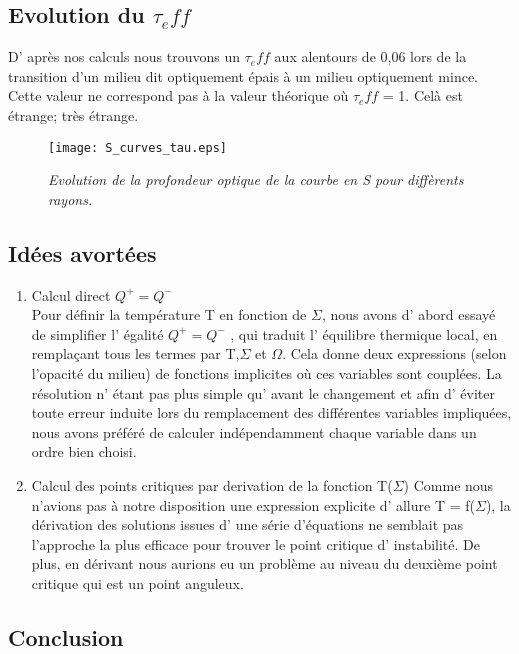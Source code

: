 \subsection{Evolution du $\tau_eff$}

D' après nos calculs nous trouvons un $\tau_eff$ aux alentours de 0,06 lors de la transition d'un milieu dit optiquement épais à un milieu optiquement mince. Cette valeur ne correspond pas à la valeur théorique où $\tau_eff$ = 1. 
Celà est étrange; très étrange.

\begin{figure}[htb!]
	\centering
	\texttt{[image: S\_curves\_tau.eps]}
	\caption{\textit{Evolution de la profondeur optique de la courbe en S pour diffèrents rayons.}  }
	\label{Fig::bench}
\end{figure}

\subsection{Idées avortées}
\begin{enumerate}

\item Calcul direct $Q^+ = Q^-$
\\
Pour définir la température T en fonction de $\Sigma$, nous avons d' abord essayé de simplifier l' égalité $Q^+ = Q^-$ , qui traduit l' équilibre thermique local, en remplaçant tous les termes par T,$\Sigma$ et $\Omega$. Cela donne deux expressions (selon l'opacité du milieu) de fonctions implicites où ces variables sont couplées.
La résolution n' étant pas plus simple qu' avant le changement et afin d' éviter toute erreur induite lors du remplacement des différentes variables impliquées, nous avons préféré de calculer indépendamment chaque variable dans un ordre bien choisi. 
\\

\item Calcul des points critiques par derivation de la fonction T($\Sigma$)
Comme nous n'avions pas à notre disposition une expression explicite d' allure T = f($\Sigma$), la dérivation des solutions issues d' une série d'équations ne semblait pas l'approche la plus efficace pour trouver le point critique d' instabilité. De plus, en dérivant nous aurions eu un problème au niveau du deuxième point critique qui est un point anguleux.
\end{enumerate}

\subsection{Conclusion}

